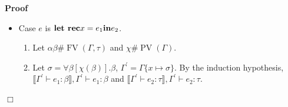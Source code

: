 \documentclass{article}
\newcommand{\assign}{:=}
\newcommand{\tmname}[1]{\textsc{#1}}
\newcommand{\tmop}[1]{\ensuremath{\operatorname{#1}}}
\newcommand{\tmstrong}[1]{\textbf{#1}}
\newenvironment{proof}{\noindent\textbf{Proof\ }}{\hspace*{\fill}$\Box$\medskip}
\begin{document}
\begin{proof}
\begin{itemize}
\begin{enumerate}
      \item By induction hypothesis and weakening for each $i = 1, \ldots, n$
      \[ \wedge_j \llbracket \Gamma \vdash e_j : \tau_j \rrbracket \wedge D
         \wedge \varepsilon (\bar{\alpha}) \dot{=} \tau, \Gamma \vdash e_i :
         \tau_i \]
      \item Applying {\tmname{Cstr}} to (1) and (3) we obtain
      \[ \wedge_i \llbracket \Gamma \vdash e_i : \tau_i \rrbracket \wedge D
         \wedge \varepsilon (\bar{\alpha}) \dot{=} \tau, \Gamma \vdash Ke_1
         \ldots e_n : \varepsilon (\bar{\alpha}) \]
      \item Let $\bar{\alpha}^{\prime} \bar{\beta}^{\prime} \# \tmop{FV}
      (\Gamma, \tau)$ and $\tau_i^{\prime} \assign \tau_i [\bar{\alpha}
      \bar{\beta} \assign \bar{\alpha}^{\prime} \bar{\beta}^{\prime}]$,
      $D^{\prime} \assign D [\beta \bar{\alpha} \assign \beta^{\prime}
      \bar{\alpha}^{\prime}]$.
      \[ \bar{\alpha} \bar{\beta} \dot{=} \bar{\alpha}^{\prime}
         \bar{\beta}^{\prime} \wedge_i \llbracket \Gamma \vdash e_i :
         \tau_i^{\prime} \rrbracket \wedge D \wedge \varepsilon
         (\bar{\alpha}^{\prime}) \dot{=} \tau, \Gamma \vdash Ke_1 \ldots e_n :
         \varepsilon (\bar{\alpha}^{\prime}) \]
      \item By {\tmname{Equ}}, (1) {\tmname{Hide}} and weakening, since
      w.l.o.g. $\bar{\alpha} \bar{\beta}$ do not appear unbounded in the goal,
      $\llbracket \Gamma \vdash Ke_1 \ldots e_n : \tau \rrbracket, \Gamma
      \vdash Ke_1 \ldots e_n : \tau$.
    \end{enumerate}
    \item Case $e$ is $\text{{\tmstrong{let rec}}} x = e_1 
    \text{{\tmstrong{in}}} e_2$.
    \begin{enumerate}
      \item Let $\alpha \beta \# \tmop{FV} (\Gamma, \tau)$ and $\chi \#
      \tmop{PV} (\Gamma)$.
      
      \item Let $\sigma = \forall \beta [\chi (\beta)] . \beta$,
      $\Gamma^{\prime} = \Gamma \{x \mapsto \sigma\}$. By the induction
      hypothesis, $\llbracket \Gamma^{\prime} \vdash e_1 : \beta \rrbracket,
      \Gamma^{\prime} \vdash e_1 : \beta$ and $\llbracket \Gamma^{\prime}
      \vdash e_2 : \tau \rrbracket, \Gamma^{\prime} \vdash e_2 : \tau$.
      

\end{enumerate}
\end{itemize}
\end{proof}
\end{document}

